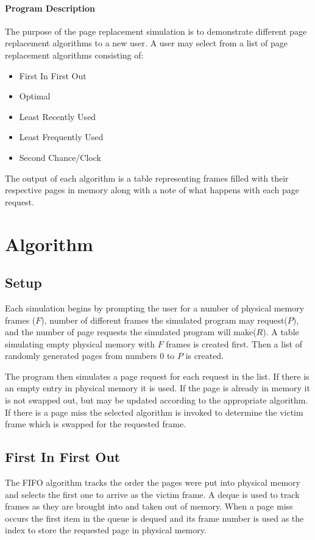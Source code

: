 

\begin{multicols}{2}

\paragraph{Program  Description}
The purpose of the page replacement simulation is to demonstrate different page replacement algorithms to a new user. A user may select from a list of page replacement algorithms consisting of:
\begin{itemize}
\item 	First In First Out
\item 	Optimal
\item 	Least Recently Used
\item 	Least Frequently Used
\item 	Second Chance/Clock
\end{itemize}
The output of each algorithm is a table representing frames filled with their respective pages in memory along with a note of what happens with each page request.

\section{Algorithm}\label{algorithm}
\subsection{Setup}
Each simulation begins by prompting the user for a number of physical memory frames ($F$), number of different frames the simulated program may request($P$), and the number of page requests the simulated program will make($R$). A table simulating empty physical memory with $F$ frames is created first. Then a list of randomly generated pages from numbers 0 to $P$ is created.

The program then simulates a page request for each request in the list. If there is an empty entry in physical memory it is used. If the page is already in memory it is not swapped out, but may be updated according to the appropriate algorithm. If there is a page miss the selected algorithm is invoked to determine the victim frame which is swapped for the requested frame.

\subsection{First In First Out}
The FIFO algorithm tracks the order the pages were put into physical memory and selects the first one to arrive as the victim frame. A deque is used to track frames as they are brought into and taken out of memory. When a page miss occurs the first item in the queue is dequed and its frame number is used as the index to store the requested page in physical memory. 


\end{multicols}
